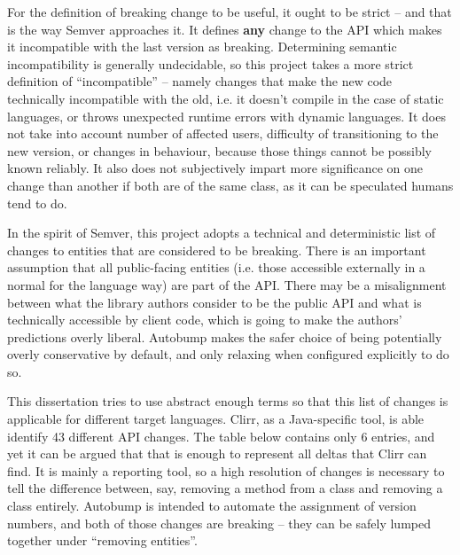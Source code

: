 \documentclass{l4proj}
\begin{document}
For the definition of breaking change to be useful, it ought to be
strict -- and that is the way Semver approaches it. It defines
\textbf{any} change to the API which makes it incompatible with the
last version as breaking. Determining semantic incompatibility is
generally undecidable, so this project takes a more strict definition of
``incompatible'' -- namely changes that make the new code technically
incompatible with the old, i.e. it doesn't compile in the case of
static languages, or throws unexpected runtime errors with dynamic
languages. It does not take into account number of affected users,
difficulty of transitioning to the new version, or changes in
behaviour, because those things cannot be possibly known reliably. It
also does not subjectively impart more significance on one change than
another if both are of the same class, as it can be speculated humans
tend to do.

In the spirit of Semver, this project adopts a technical and
deterministic list of changes to entities that are considered
to be breaking. There is an important assumption that all
public-facing entities (i.e. those accessible externally in a normal
for the language way) are part of the API. There may be a misalignment
between what the library authors consider to be the public API and
what is technically accessible by client code, which is going to make
the authors' predictions overly liberal. Autobump makes the safer
choice of being potentially overly conservative by default, and only
relaxing when configured explicitly to do so.

This dissertation tries to use abstract enough terms so that this list
of changes is applicable for different target languages. Clirr, as a
Java-specific tool, is able identify 43 different API changes. The
table below contains only 6 entries, and yet it can be argued that
that is enough to represent all deltas that Clirr can find. It is
mainly a reporting tool, so a high resolution of changes is necessary
to tell the difference between, say, removing a method from a class
and removing a class entirely. Autobump is intended to automate the
assignment of version numbers, and both of those changes are breaking
-- they can be safely lumped together under ``removing entities''.
\end{document}
